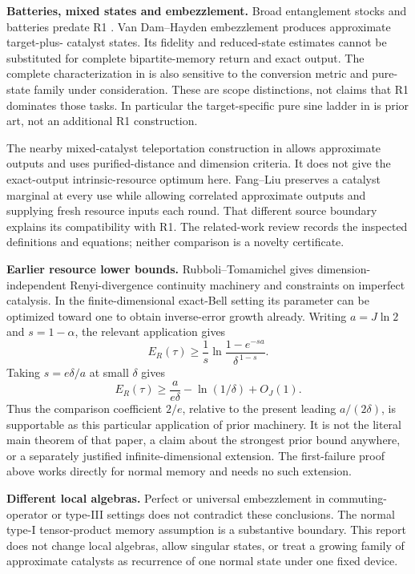 \documentclass[11pt,a4paper]{article}
\numberwithin{equation}{section}
\theoremstyle{remark}
\newcommand{\ER}{E_R}
\begin{document}
\textbf{Batteries, mixed states and embezzlement.}
Broad entanglement stocks and batteries predate R1 \cite{Battery}.
Van Dam--Hayden embezzlement \cite{vDH} produces approximate target-plus-
catalyst states. Its fidelity and reduced-state estimates cannot be
substituted for complete bipartite-memory return and exact output.
The complete characterization in \cite{ZTG} is also sensitive to
the conversion metric and pure-state family under consideration.
These are scope distinctions, not claims that R1 dominates those tasks.
In particular the target-specific pure sine ladder in
\cite[Eq.~(9)]{LW} is prior art, not an additional R1 construction.

The nearby mixed-catalyst teleportation construction in \cite{Xing}
allows approximate outputs and uses purified-distance and dimension
criteria. It does not give the exact-output intrinsic-resource optimum here.
Fang--Liu \cite{FangLiu} preserves a catalyst marginal at every use while
allowing correlated approximate outputs and supplying fresh resource
inputs each round. That different source boundary explains its
compatibility with R1. The related-work review records the inspected
definitions and equations; neither comparison is a novelty certificate.

\textbf{Earlier resource lower bounds.}
Rubboli--Tomamichel \cite{RT} gives dimension-independent
Renyi-divergence continuity machinery and constraints on imperfect
catalysis. In the finite-dimensional exact-Bell setting its parameter
can be optimized toward one to obtain inverse-error growth already.
Writing \(a=J\ln2\) and \(s=1-\alpha\), the relevant application gives
\[
 \ER(\tau)\geq \frac1s
        \ln\frac{1-e^{-sa}}{\delta^{\,1-s}}.
\]
Taking \(s=e\delta/a\) at small \(\delta\) gives
\[
 \ER(\tau)\geq \frac{a}{e\delta}-\ln(1/\delta)+O_J(1).
\]
Thus the comparison coefficient \(2/e\), relative to the present leading
\(a/(2\delta)\), is supportable as this particular application of prior
machinery. It is not the literal main theorem of that paper, a claim
about the strongest prior bound anywhere, or a separately justified
infinite-dimensional extension. The first-failure proof above works
directly for normal memory and needs no such extension.

\textbf{Different local algebras.}
Perfect or universal embezzlement in commuting-operator or type-III
settings \cite{CLP,vLSWW} does not contradict these conclusions.
The normal type-I tensor-product memory assumption is a substantive
boundary. This report does not change local algebras, allow singular
states, or treat a growing family of approximate catalysts as recurrence
of one normal state under one fixed device.
\end{document}
